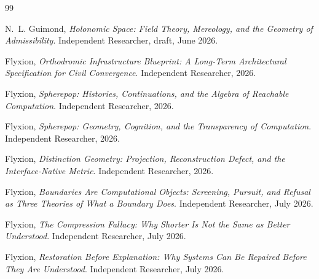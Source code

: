 \documentclass[11pt,fleqn]{book}
\numberwithin{equation}{chapter}
\theoremstyle{plain}
\theoremstyle{definition}
\theoremstyle{remark}
\begin{document}
\begin{thebibliography}{99}


N.~L. Guimond, \emph{Holonomic Space: Field Theory, Mereology, and the Geometry of Admissibility}. Independent Researcher, draft, June 2026.

Flyxion, \emph{Orthodromic Infrastructure Blueprint: A Long-Term Architectural Specification for Civil Convergence}. Independent Researcher, 2026.

Flyxion, \emph{Spherepop: Histories, Continuations, and the Algebra of Reachable Computation}. Independent Researcher, 2026.

Flyxion, \emph{Spherepop: Geometry, Cognition, and the Transparency of Computation}. Independent Researcher, 2026.

Flyxion, \emph{Distinction Geometry: Projection, Reconstruction Defect, and the Interface-Native Metric}. Independent Researcher, 2026.

Flyxion, \emph{Boundaries Are Computational Objects: Screening, Pursuit, and Refusal as Three Theories of What a Boundary Does}. Independent Researcher, July 2026.

Flyxion, \emph{The Compression Fallacy: Why Shorter Is Not the Same as Better Understood}. Independent Researcher, July 2026.

Flyxion, \emph{Restoration Before Explanation: Why Systems Can Be Repaired Before They Are Understood}. Independent Researcher, July 2026.



\end{thebibliography}
\end{document}

